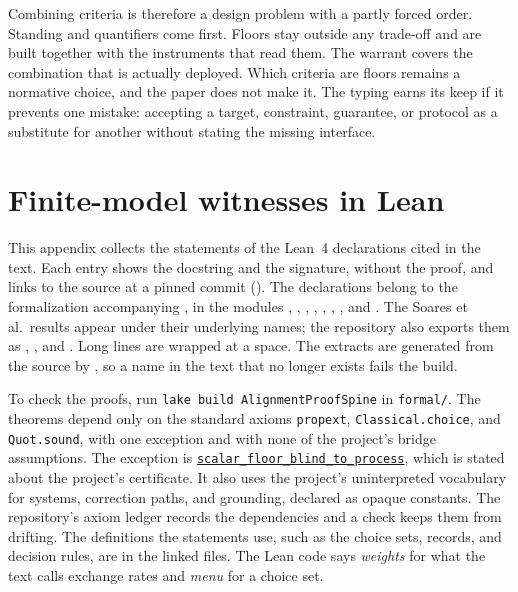 \documentclass[11pt]{article}
\newcommand{\lean}[1]{\hyperref[lean:#1]{\nolinkurl{#1}}}
\begin{document}
Combining criteria is therefore a design problem with a partly forced order.
Standing and quantifiers come first.
Floors stay outside any trade-off and are built together with the instruments that read them.
The warrant covers the combination that is actually deployed.
Which criteria are floors remains a normative choice, and the paper does not make it.
The typing earns its keep if it prevents one mistake: accepting a target, constraint, guarantee, or protocol as a substitute for another without stating the missing interface.

\printbibliography

\appendix
\section{Finite-model witnesses in Lean}
\label{app:lean}

This appendix collects the statements of the Lean~4 declarations cited in the text.
Each entry shows the docstring and the signature, without the proof, and links to the source at a pinned commit (\texttt{\leanpin}).
The declarations belong to the formalization accompanying \textcite{zarncke2026tsa}, in the modules , , , , , , , and .
The Soares et al.\ results appear under their underlying names; the repository also exports them as , , and .
Long lines are wrapped at a space.
The extracts are generated from the source by , so a name in the text that no longer exists fails the build.

To check the proofs, run \texttt{lake build AlignmentProofSpine} in \texttt{formal/}.
The theorems depend only on the standard axioms \texttt{propext}, \texttt{Classical.choice}, and \texttt{Quot.sound}, with one exception and with none of the project's bridge assumptions.
The exception is \lean{scalar_floor_blind_to_process}, which is stated about the project's certificate.
It also uses the project's uninterpreted vocabulary for systems, correction paths, and grounding, declared as opaque constants.
The repository's axiom ledger records the dependencies and a check keeps them from drifting.
The definitions the statements use, such as the choice sets, records, and decision rules, are in the linked files.
The Lean code says \emph{weights} for what the text calls exchange rates and \emph{menu} for a choice set.


\end{document}
